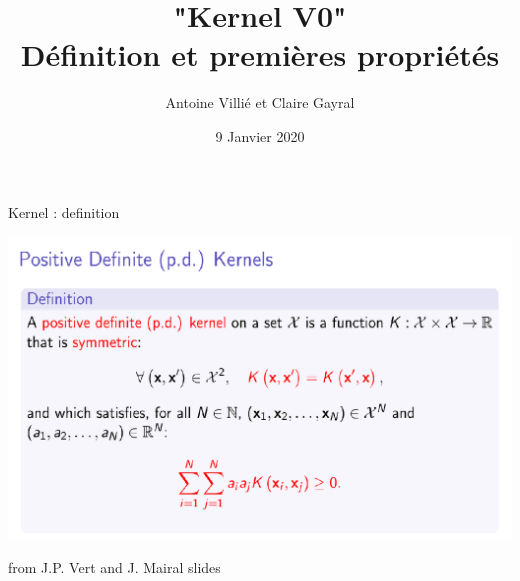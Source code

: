 \documentclass[10pt]{beamer}
\title{"Kernel V0" \\ Définition et premières propriétés}
\author{Antoine Villié et Claire Gayral}
\date{9 Janvier 2020}
\begin{document}
\begin{frame}{}
    \frametitle{}
    \titlepage
\end{frame}

\begin{frame}{Kernel : definition}
    \begin{center} 
        \includegraphics[width=.99\linewidth]{JPV_slide14.png}
    \end{center}
    from J.P. Vert and J. Mairal slides
\end{frame}
\end{document}
